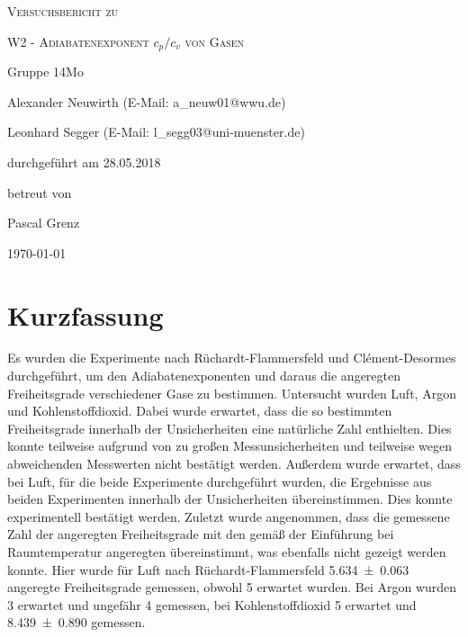 \documentclass[
	a4paper,
	12pt,
	pagesize,
	ngerman
]{scrartcl}
\begin{document}
	
	\begin{titlepage}
		\centering
		{\scshape\LARGE Versuchsbericht zu \par}
		\vspace{1cm}
		{\scshape\huge W2 - Adiabatenexponent $c_p/c_v$ von Gasen \par} %
		\vspace{2.5cm}
		{\LARGE Gruppe 14Mo \par}
		\vspace{0.5cm}
		
		{\large Alexander Neuwirth (E-Mail: a\_neuw01@wwu.de) \par}
		{\large Leonhard Segger (E-Mail: l\_segg03@uni-muenster.de) \par}
		\vfill
		
		durchgeführt am 28.05.2018\par
		betreut von\par
		{\large Pascal Grenz}
		
		\vfill
		
		{\large \today\par}
	\end{titlepage}
	\tableofcontents
	\newpage

	\section{Kurzfassung}
	Es wurden die Experimente nach Rüchardt-Flammersfeld und Clément-Desormes durchgeführt, um den Adiabatenexponenten und daraus die angeregten Freiheitsgrade verschiedener Gase zu bestimmen.
	Untersucht wurden Luft, Argon und Kohlenstoffdioxid.
	Dabei wurde erwartet, dass die so bestimmten Freiheitsgrade innerhalb der Unsicherheiten eine natürliche Zahl enthielten.
	Dies konnte teilweise aufgrund von zu großen Messunsicherheiten und teilweise wegen abweichenden Messwerten nicht bestätigt werden.
	Außerdem wurde erwartet, dass bei Luft, für die beide Experimente durchgeführt wurden, die Ergebnisse aus beiden Experimenten innerhalb der Unsicherheiten übereinstimmen.
	Dies konnte experimentell bestätigt werden.
	Zuletzt wurde angenommen, dass die gemessene Zahl der angeregten Freiheitsgrade mit den gemäß der Einführung bei Raumtemperatur angeregten übereinstimmt, was ebenfalls nicht gezeigt werden konnte.
	Hier wurde für Luft nach Rüchardt-Flammersfeld \SI{5,634\pm 0,063}{} angeregte Freiheitsgrade gemessen, obwohl 5 erwartet wurden.
	Bei Argon wurden 3 erwartet und ungefähr 4 gemessen, bei Kohlenstoffdioxid 5 erwartet und \SI{8,439\pm 0,890}{} gemessen. %
	
\end{document}
